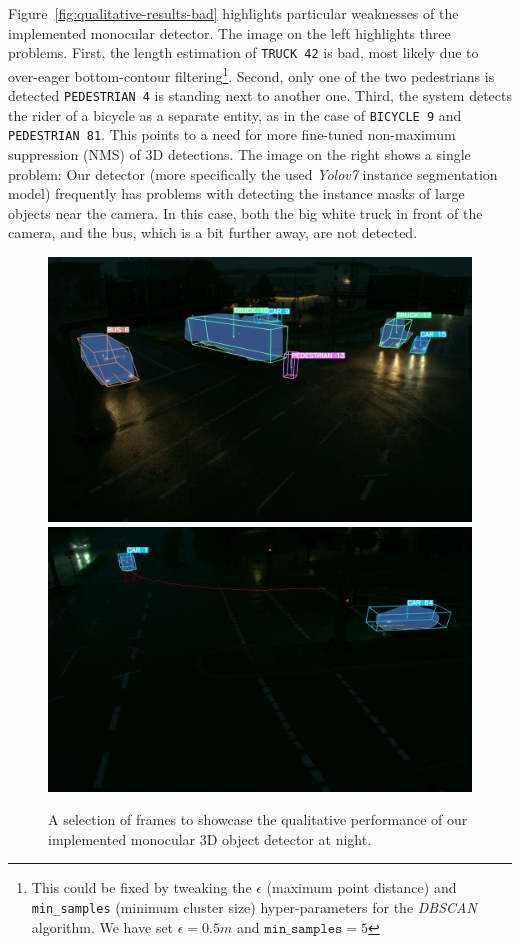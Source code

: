 Figure~\ref{fig:qualitative-results-bad} highlights particular weaknesses of the implemented monocular detector.
The image on the left highlights three problems.
First, the length estimation of \texttt{TRUCK 42} is bad, most likely due to over-eager bottom-contour filtering\footnote{This could be fixed by tweaking the $\epsilon$ (maximum point distance) and \texttt{min\_samples} (minimum cluster size) hyper-parameters for the \textit{DBSCAN} algorithm. We have set $\epsilon=0.5 m$ and $\mathtt{min\_samples}=5$}.
Second, only one of the two pedestrians is detected \textemdash \texttt{PEDESTRIAN 4} is standing next to another one.
Third, the system detects the rider of a bicycle as a separate entity, as in the case of \texttt{BICYCLE 9} and \texttt{PEDESTRIAN 81}.
This points to a need for more fine-tuned non-maximum suppression (NMS) of 3D detections.
The image on the right shows a single problem: Our detector (more specifically the used \textit{Yolov7} instance segmentation model) frequently has problems with detecting the instance masks of large objects near the camera.
In this case, both the big white truck in front of the camera, and the bus, which is a bit further away, are not detected.

\begin{figure}[htb]
    \includegraphics[width=0.499\linewidth]{
        figures/selection/1653330059-588901912-s110-camera-basler-south2-8mm}
    \includegraphics[width=0.499\linewidth]{
        figures/selection/1653330064-207615030-s110-camera-basler-south1-8mm}
    \caption{A selection of frames to showcase the qualitative performance of our implemented monocular 3D object detector at night.}
    \label{fig:qualitative-results-night}
\end{figure}

